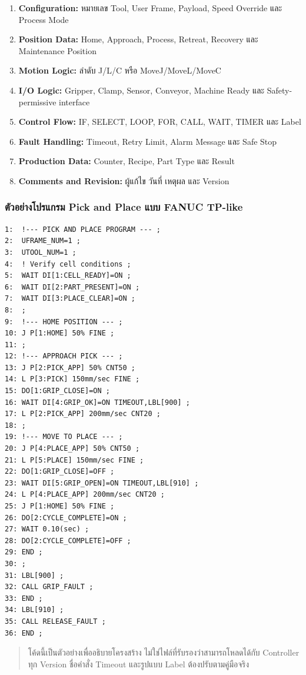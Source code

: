 \begin{enumerate}
    \item \textbf{Configuration:} หมายเลข Tool, User Frame, Payload, Speed Override และ Process Mode
    \item \textbf{Position Data:} Home, Approach, Process, Retreat, Recovery และ Maintenance Position
    \item \textbf{Motion Logic:} ลำดับ J/L/C หรือ MoveJ/MoveL/MoveC
    \item \textbf{I/O Logic:} Gripper, Clamp, Sensor, Conveyor, Machine Ready และ Safety-permissive interface
    \item \textbf{Control Flow:} IF, SELECT, LOOP, FOR, CALL, WAIT, TIMER และ Label
    \item \textbf{Fault Handling:} Timeout, Retry Limit, Alarm Message และ Safe Stop
    \item \textbf{Production Data:} Counter, Recipe, Part Type และ Result
    \item \textbf{Comments and Revision:} ผู้แก้ไข วันที่ เหตุผล และ Version
\end{enumerate}

\subsubsection{ตัวอย่างโปรแกรม Pick and Place แบบ FANUC TP-like}

\begin{verbatim}
1:  !--- PICK AND PLACE PROGRAM --- ;
2:  UFRAME_NUM=1 ;
3:  UTOOL_NUM=1 ;
4:  ! Verify cell conditions ;
5:  WAIT DI[1:CELL_READY]=ON ;
6:  WAIT DI[2:PART_PRESENT]=ON ;
7:  WAIT DI[3:PLACE_CLEAR]=ON ;
8:  ;
9:  !--- HOME POSITION --- ;
10: J P[1:HOME] 50% FINE ;
11: ;
12: !--- APPROACH PICK --- ;
13: J P[2:PICK_APP] 50% CNT50 ;
14: L P[3:PICK] 150mm/sec FINE ;
15: DO[1:GRIP_CLOSE]=ON ;
16: WAIT DI[4:GRIP_OK]=ON TIMEOUT,LBL[900] ;
17: L P[2:PICK_APP] 200mm/sec CNT20 ;
18: ;
19: !--- MOVE TO PLACE --- ;
20: J P[4:PLACE_APP] 50% CNT50 ;
21: L P[5:PLACE] 150mm/sec FINE ;
22: DO[1:GRIP_CLOSE]=OFF ;
23: WAIT DI[5:GRIP_OPEN]=ON TIMEOUT,LBL[910] ;
24: L P[4:PLACE_APP] 200mm/sec CNT20 ;
25: J P[1:HOME] 50% FINE ;
26: DO[2:CYCLE_COMPLETE]=ON ;
27: WAIT 0.10(sec) ;
28: DO[2:CYCLE_COMPLETE]=OFF ;
29: END ;
30: ;
31: LBL[900] ;
32: CALL GRIP_FAULT ;
33: END ;
34: LBL[910] ;
35: CALL RELEASE_FAULT ;
36: END ;
\end{verbatim}

\begin{quote}
โค้ดนี้เป็นตัวอย่างเพื่ออธิบายโครงสร้าง ไม่ใช่ไฟล์ที่รับรองว่าสามารถโหลดได้กับ Controller ทุก Version ชื่อคำสั่ง Timeout และรูปแบบ Label ต้องปรับตามคู่มือจริง
\end{quote}

